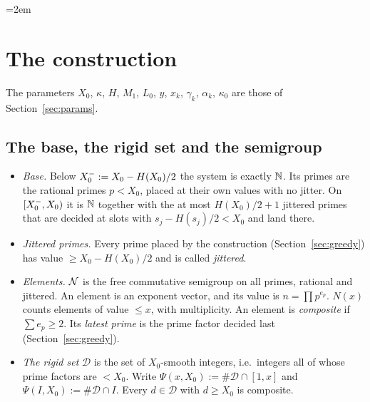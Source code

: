 \begingroup\emergencystretch=2em %
\section{The construction}\label{sec:construction}

The parameters $X_0$, $\kappa$, $H$, $M_1$, $L_0$, $y$, $x_k$, $\gamma_k$, $\alpha_k$, $\kappa_0$ are those of Section~\ref{sec:params}.

\subsection{The base, the rigid set and the semigroup}
\begin{itemize}
\item \emph{Base.} Below $X_0^{-}:=X_0-H(X_0)/2$ the system is exactly $\mathbb{N}$. Its primes are the rational primes $p<X_0$, placed at
their own values with no jitter. On $[X_0^{-},X_0)$ it is $\mathbb{N}$ together with the at most $H(X_0)/2+1$ jittered primes that are decided
at slots with $s_j-H(s_j)/2<X_0$ and land there.
\item \emph{Jittered primes.} Every prime placed by the construction (Section~\ref{sec:greedy}) has value $\ge X_0-H(X_0)/2$ and is
called \emph{jittered}.
\item \emph{Elements.} $\mathcal{N}$ is the free commutative semigroup on all primes, rational and jittered. An element is an exponent
vector, and its value is $n=\prod p^{e_p}$. $N(x)$ counts elements of value $\le x$, with multiplicity. An element is
\emph{composite} if $\sum e_p\ge2$. Its \emph{latest prime} is the prime factor decided last (Section~\ref{sec:greedy}).
\item \emph{The rigid set} $\mathcal D$ is the set of $X_0$-smooth integers, i.e.\ integers all of whose prime factors are $<X_0$.
Write $\Psi(x,X_0):=\#\mathcal D\cap[1,x]$ and $\Psi(I,X_0):=\#\mathcal D\cap I$. Every $d\in\mathcal D$ with $d\ge X_0$ is composite.
\end{itemize}

